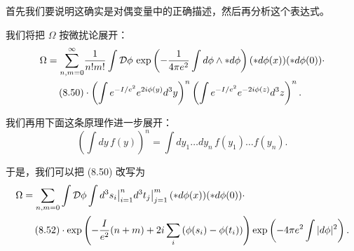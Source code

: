 首先我们要说明这确实是对偶变量中的正确描述，然后再分析这个表达式。

我们将把 $\Omega$ 按微扰论展开：
\begin{align}
  \Omega=\sum_{n,m=0}^{\infty}&\frac{1}{n!m!}\int\mathcal{D}\phi\,\exp\left(-\frac{1}{4\pi e^2}\int d\phi\wedge\ast d\phi\right)(\ast d\phi(x))(\ast d\phi(0))\cdot\notag\\
  \tag{8.50}
  \label{eq:8-50}
  &\cdot\left(\int e^{-I/e^2}e^{2i\phi(y)}d^3y\right)^{n}\left(\int e^{-I/e^2}e^{-2i\phi(z)}d^3z\right)^{n}.
\end{align}

我们再用下面这条原理作进一步展开：
\begin{equation}
  \tag{8.51}
  \label{eq:8-51}
  \left(\int dy\,f(y)\right)^{n}=\int dy_1\dots dy_n\,f(y_1)\dots f(y_n).
\end{equation}

于是，我们可以把 (8.50) 改写为
\begin{align}
  \Omega=\sum_{n,m=0}&\int\mathcal{D}\phi\int d^3s_i\big|_{i=1}^{n}d^3t_j\big|_{j=1}^{m}\,(\ast d\phi(x))(\ast d\phi(0))\cdot\notag\\
  \tag{8.52}
  \label{eq:8-52}
  &\cdot\exp\left(-\frac{I}{e^2}(n+m)+2i\sum_i\left(\phi(s_i)-\phi(t_i)\right)\right)\exp\left(-4\pi e^2\int|d\phi|^2\right).
\end{align}



